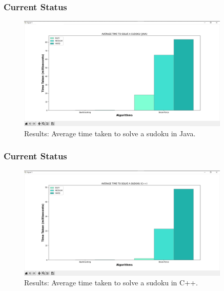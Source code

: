 \documentclass{beamer}
\begin{document}
\begin{frame}
     \frametitle{Current Status}   
		  \begin{figure}
		  \includegraphics[width=0.9\textwidth]{./week7_img/graph_java.png}
		  \caption{Results: Average time taken to solve a sudoku in Java.}
		  \centering
		  \end{figure}
\end{frame}

\begin{frame}
     \frametitle{Current Status}   
		  \begin{figure}
		  \includegraphics[width=0.9\textwidth]{./week7_img/graph_C++.png}
		  \caption{Results: Average time taken to solve a sudoku in C++.}
		  \centering
		  \end{figure}
\end{frame}
\end{document}

